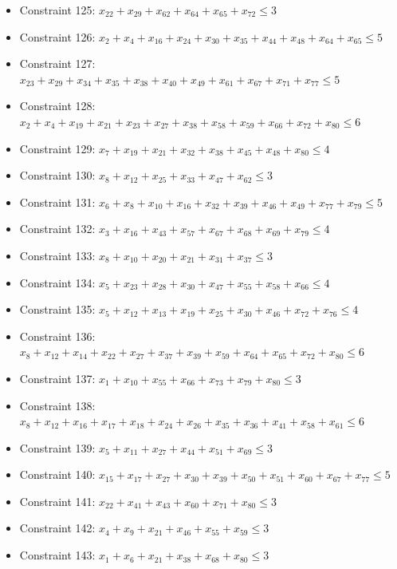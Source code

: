 \documentclass[11pt]{article}
\begin{document}
\begin{itemize}
\item Constraint 125: $x_{22} + x_{29} + x_{62} + x_{64} + x_{65} + x_{72} \le 3$
\item Constraint 126: $x_{2} + x_{4} + x_{16} + x_{24} + x_{30} + x_{35} + x_{44} + x_{48} + x_{64} + x_{65} \le 5$
\item Constraint 127: $x_{23} + x_{29} + x_{34} + x_{35} + x_{38} + x_{40} + x_{49} + x_{61} + x_{67} + x_{71} + x_{77} \le 5$
\item Constraint 128: $x_{2} + x_{4} + x_{19} + x_{21} + x_{23} + x_{27} + x_{38} + x_{58} + x_{59} + x_{66} + x_{72} + x_{80} \le 6$
\item Constraint 129: $x_{7} + x_{19} + x_{21} + x_{32} + x_{38} + x_{45} + x_{48} + x_{80} \le 4$
\item Constraint 130: $x_{8} + x_{12} + x_{25} + x_{33} + x_{47} + x_{62} \le 3$
\item Constraint 131: $x_{6} + x_{8} + x_{10} + x_{16} + x_{32} + x_{39} + x_{46} + x_{49} + x_{77} + x_{79} \le 5$
\item Constraint 132: $x_{3} + x_{16} + x_{43} + x_{57} + x_{67} + x_{68} + x_{69} + x_{79} \le 4$
\item Constraint 133: $x_{8} + x_{10} + x_{20} + x_{21} + x_{31} + x_{37} \le 3$
\item Constraint 134: $x_{5} + x_{23} + x_{28} + x_{30} + x_{47} + x_{55} + x_{58} + x_{66} \le 4$
\item Constraint 135: $x_{5} + x_{12} + x_{13} + x_{19} + x_{25} + x_{30} + x_{46} + x_{72} + x_{76} \le 4$
\item Constraint 136: $x_{8} + x_{12} + x_{14} + x_{22} + x_{27} + x_{37} + x_{39} + x_{59} + x_{64} + x_{65} + x_{72} + x_{80} \le 6$
\item Constraint 137: $x_{1} + x_{10} + x_{55} + x_{66} + x_{73} + x_{79} + x_{80} \le 3$
\item Constraint 138: $x_{8} + x_{12} + x_{16} + x_{17} + x_{18} + x_{24} + x_{26} + x_{35} + x_{36} + x_{41} + x_{58} + x_{61} \le 6$
\item Constraint 139: $x_{5} + x_{11} + x_{27} + x_{44} + x_{51} + x_{69} \le 3$
\item Constraint 140: $x_{15} + x_{17} + x_{27} + x_{30} + x_{39} + x_{50} + x_{51} + x_{60} + x_{67} + x_{77} \le 5$
\item Constraint 141: $x_{22} + x_{41} + x_{43} + x_{60} + x_{71} + x_{80} \le 3$
\item Constraint 142: $x_{4} + x_{9} + x_{21} + x_{46} + x_{55} + x_{59} \le 3$
\item Constraint 143: $x_{1} + x_{6} + x_{21} + x_{38} + x_{68} + x_{80} \le 3$

\end{itemize}
\end{document}
